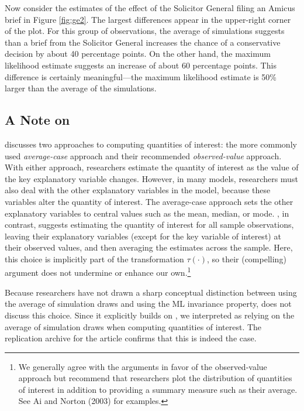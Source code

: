 \documentclass[11pt]{article}
\begin{document}
Now consider the estimates of the effect of the Solicitor General filing an Amicus brief in Figure \ref{fig:ge2}.
The largest differences appear in the upper-right corner of the plot.
For this group of observations, the average of simulations suggests than a brief from the Solicitor General increases the chance of a conservative decision by about 40 percentage points.
On the other hand, the maximum likelihood estimate suggests an increase of about 60 percentage points.
This difference is certainly meaningful---the maximum likelihood estimate is 50\% larger than the average of the simulations.

\subsection*{A Note on \cite{HanmerKalkan2013}}

\cite{HanmerKalkan2013} discusses two approaches to computing quantities of interest: the more commonly used {\it average-case} approach and their recommended {\it observed-value} approach.
With either approach, researchers estimate the quantity of interest as the value of the key explanatory variable changes.
However, in many models, researchers must also deal with the other explanatory variables in the model, because these variables alter the quantity of interest.
The average-case approach sets the other explanatory variables to central values such as the mean, median, or mode.
\cite{HanmerKalkan2013}, in contrast, suggests estimating the quantity of interest for all sample observations, leaving their explanatory variables (except for the key variable of interest) at their observed values, and then averaging the estimates across the sample.
Here, this choice is implicitly part of the transformation $\tau(\cdot)$, so their (compelling) argument does not undermine or enhance our own.\footnote{We generally agree with the arguments in favor of the observed-value approach but recommend that researchers plot the distribution of quantities of interest in addition to providing a summary measure such as their average.
See Ai and Norton (2003) for examples.}

Because researchers have not drawn a sharp conceptual distinction between using the average of simulation draws and using the ML invariance property, \cite{HanmerKalkan2013} does not discuss this choice.
Since it explicitly builds on \cite{KingTomzWittenberg2000}, we interpreted \cite{HanmerKalkan2013} as relying on the average of simulation draws when computing quantities of interest.
The replication archive for the article confirms that this is indeed the case.
\end{document}

